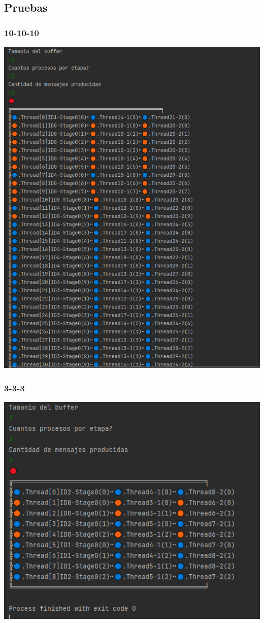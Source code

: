 \documentclass[a4paper]{article}
\begin{document}
\subsection{Pruebas}
\subsubsection{10-10-10}
\includegraphics{10-10-10.PNG}

\subsubsection{3-3-3}
\includegraphics{3-3-3.PNG}
\end{document}
